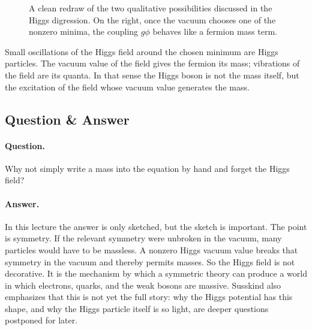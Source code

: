 \begin{figure}[htbp]
\centering
{}
\caption{A clean redraw of the two qualitative possibilities discussed in the Higgs digression. On the right, once the vacuum chooses one of the nonzero minima, the coupling \(g\phi\) behaves like a fermion mass term.}
\end{figure}

Small oscillations of the Higgs field around the chosen minimum are Higgs particles. The vacuum value of the field gives the fermion its mass; vibrations of the field are its quanta. In that sense the Higgs boson is not the mass itself, but the excitation of the field whose vacuum value generates the mass.

\subsection{Question \& Answer}

\paragraph{Question.} Why not simply write a mass into the equation by hand and forget the Higgs field?

\paragraph{Answer.} In this lecture the answer is only sketched, but the sketch is important. The point is symmetry. If the relevant symmetry were unbroken in the vacuum, many particles would have to be massless. A nonzero Higgs vacuum value breaks that symmetry in the vacuum and thereby permits masses. So the Higgs field is not decorative. It is the mechanism by which a symmetric theory can produce a world in which electrons, quarks, and the weak bosons are massive. Susskind also emphasizes that this is not yet the full story: why the Higgs potential has this shape, and why the Higgs particle itself is so light, are deeper questions postponed for later.


